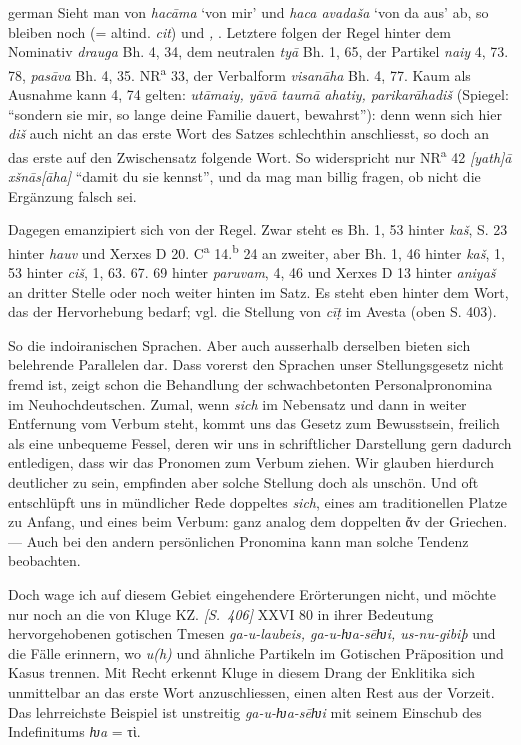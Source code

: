 \begin{otherlanguage*}{german}
Sieht man von \emph{hacāma} ‘von mir’ und \emph{haca avadaša} ‘von da aus’ ab, so bleiben noch \emph{} (= altind. \emph{cit}) und \emph{, }. Letztere folgen der Regel hinter dem Nominativ \emph{drauga} Bh. 4, 34, dem neutralen \emph{tyā} Bh. 1, 65, der Partikel \emph{naiy} 4, 73. 78, \emph{pasāva} Bh. 4, 35. NR\textsuperscript{a} 33, der Verbalform \emph{visanāha} Bh. 4, 77. Kaum als Ausnahme kann 4, 74 gelten: \emph{utāmaiy, yāvā taumā ahatiy, parikarāhadiš} (Spiegel: “sondern sie mir, so lange deine Familie dauert, bewahrst”): denn wenn sich hier \emph{diš} auch nicht an das erste Wort des Satzes schlechthin anschliesst, so doch an das erste auf den Zwischensatz folgende Wort. So widerspricht nur NR\textsuperscript{a} 42 \emph{[yath]ā xšnās[āha]} “damit du sie kennst”, und da mag man billig fragen, ob nicht die Ergänzung falsch sei.

Dagegen \emph{} emanzipiert sich von der Regel. Zwar steht es Bh. 1, 53 hinter \emph{kaš}, S. 23 hinter \emph{hauv} und Xerxes D 20. C\textsuperscript{a} 14.\textsuperscript{b} 24 an zweiter, aber Bh. 1, 46 hinter \emph{kaš}, 1, 53 hinter \emph{ciš}, 1, 63. 67. 69 hinter \emph{paruvam}, 4, 46 und Xerxes D 13 hinter \emph{aniyaš} an dritter Stelle oder noch weiter hinten im Satz. Es steht eben hinter dem Wort, das der Hervorhebung bedarf; vgl. die Stellung von \emph{cīṭ} im Avesta (oben S. 403).

So die indoiranischen Sprachen. Aber auch ausserhalb derselben bieten sich belehrende Parallelen dar. Dass vorerst den  Sprachen unser Stellungsgesetz nicht fremd ist, zeigt schon die Behandlung der schwachbetonten Personalpronomina im Neuhochdeutschen. Zumal, wenn \emph{sich} im Nebensatz und dann in weiter Entfernung vom Verbum steht, kommt uns das Gesetz zum Bewusstsein, freilich als eine unbequeme Fessel, deren wir uns in schriftlicher Darstellung gern dadurch entledigen, dass wir das Pronomen zum Verbum ziehen. Wir glauben hierdurch deutlicher zu sein, empfinden aber solche Stellung doch als unschön. Und oft entschlüpft uns in mündlicher Rede doppeltes \emph{sich}, eines am traditionellen Platze zu Anfang, und eines beim Verbum: ganz analog dem doppelten ἄv der Griechen. — Auch bei den andern persönlichen Pronomina kann man solche Tendenz beobachten.

Doch wage ich auf diesem Gebiet eingehendere Erörterungen nicht, und möch\-te nur noch an die von Kluge KZ. \hypertarget{p406}{\emph{[S.~406]}}\label{p406} XXVI 80 in ihrer Bedeutung hervorgehobenen gotischen Tmesen \emph{ga-u-laubeis, ga-u-ƕa-sēƕi, us-nu-gibiþ} und die Fälle erinnern, wo \emph{u(h)} und ähnliche Partikeln im Gotischen Präposition und Kasus trennen. Mit Recht erkennt Kluge in diesem Drang der Enklitika sich unmittelbar an das erste Wort anzuschliessen, einen alten Rest aus der Vorzeit. Das lehrreichste Beispiel ist unstreitig \emph{ga-u-ƕa-sēƕi} mit seinem Einschub des Indefinitums \emph{ƕa} = τὶ.


\end{otherlanguage*}

